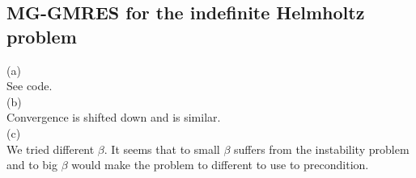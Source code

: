 \documentclass[a4paper,12pt]{article}
\begin{document}
\subsection{MG-GMRES for the indefinite Helmholtz problem}
(a) \\
See code.\\
(b) \\
Convergence is shifted down and is similar.\\
(c) \\
We tried different $\beta$. It seems that to small $\beta$ suffers from the instability problem and
to big $\beta$ would make the problem to different to use to precondition.
\end{document}
